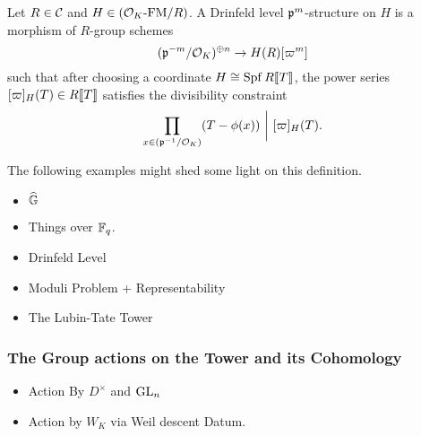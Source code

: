 \label{subsub:Deformations of Formal Modules with Drinfeld Level Structure}
\begin{defi}
  Let $R \in \mathcal{C}$ and $H \in {({\mathcal{O}_K}\text-\allowbreak\mathrm{FM}/{R})}$. A Drinfeld level 
  $\mathfrak{p}^m$-structure on $H$ is a morphism of $R$-group schemes 
  \begin{equation*}
    (\mathfrak{p}^{-m}/\mathcal{O}_K)^{\oplus n} \to H(R)[\varpi^m]
  \end{equation*}
  such that after choosing a coordinate $H \cong \operatorname{Spf} R\llbracket T \rrbracket$, the 
  power series $[\varpi]_H(T) \in R\llbracket T \rrbracket$ satisfies the divisibility constraint
  \begin{equation*}
    \prod_{x \in (\fp^{-1}/\cO_K)}(T - \phi(x)) \ \bigg\vert \ [\varpi]_H(T).
  \end{equation*}
\end{defi}
The following examples might shed some light on this definition.
\begin{xpl}
  \begin{itemize}
    \item $\widehat{\mathbb{G}}$
    \item Things over $\mathbb{F}_q$.
  \end{itemize}
\end{xpl}

\begin{itemize}
  \item Drinfeld Level
  \item Moduli Problem + Representability
  \item The Lubin-Tate Tower
\end{itemize}

\subsubsection{The Group actions on the Tower and its Cohomology} %
\label{subsub:The Group actions on the Tower}
\begin{itemize}
  \item Action By $D^\times$ and $\operatorname{GL}_n$
  \item Action by $W_K$ via Weil descent Datum.
\end{itemize}
